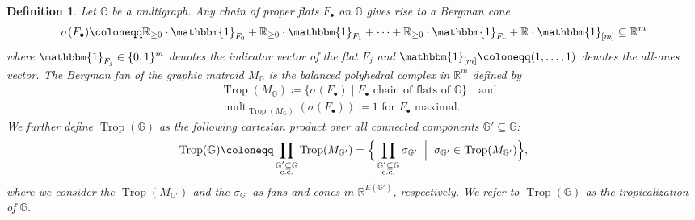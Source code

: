 \documentclass[11pt,reqno,a4paper]{amsart}
\theoremstyle{theoremstyle}
\theoremstyle{examplestyle}
\newtheorem{definition}[theorem]{Definition}
\theoremstyle{algorithmstyle}
\newcommand{\GG}{\mathbb{G}}
\newcommand{\RR}{\mathbb{R}}
\newcommand{\suchthat}{\;\ifnum\currentgrouptype=16 \middle\fi|\;}
\newcommand{\bigmid}{\left.\vphantom{\Big\{} \suchthat \vphantom{\Big\}}\right.}
\newcommand{\bbone}{\mathbbm{1}}
\DeclareMathOperator{\mult}{mult}
\DeclareMathOperator{\Trop}{Trop}
\begin{document}
\begin{definition}
  \label{def:tropicalization}
  Let $\GG$ be a multigraph.  Any chain of proper flats $F_\bullet$ on $\GG$ gives rise to a \emph{Bergman cone}
  \begin{equation*}
    \sigma(F_\bullet)\coloneqq \RR_{\geq 0}\cdot \bbone_{F_0}+\RR_{\geq 0}\cdot \bbone_{F_1}+\dots+\RR_{\geq 0}\cdot \bbone_{F_r}+\RR\cdot \bbone_{[m]}\subseteq\RR^m
  \end{equation*}
  where $\bbone_{F_j}\in \{0,1\}^m$ denotes the indicator vector of the flat $F_j$ and $\bbone_{[m]}\coloneqq(1,\dots,1)$ denotes the all-ones vector.
  The \emph{Bergman fan} of the graphic matroid $M_\GG$ is the balanced polyhedral complex in $\RR^m$ defined by
  \begin{align*}
    &\Trop(M_\GG) \coloneqq \{\sigma(F_\bullet)\mid F_\bullet \text{ chain of flats of }\GG\} \quad\text{and}\\[1mm]
    &\mult_{\Trop(M_\GG)}(\sigma(F_\bullet))\coloneqq 1 \text{ for } F_\bullet \text{ maximal}.
  \end{align*}  
  We further define $\Trop(\GG)$ as the following cartesian product over all connected components $\GG'\subseteq\GG$:
  \begin{equation*}
    \Trop(\GG) \coloneqq \prod_{\substack{\GG'\subseteq \GG\\ \text{c.c.}}} \Trop(M_{\GG'})=\Big\{\prod_{\substack{\GG'\subseteq \GG\\ \text{c.c.}}} \sigma_{\GG'} \bigmid \sigma_{\GG'}\in \Trop(M_{\GG'})\Big\},
  \end{equation*}
  where we consider the $\Trop(M_{\GG'})$ and the $\sigma_{\GG'}$ as fans and cones in $\RR^{E(\GG')}$, respectively.  We refer to $\Trop(\GG)$ as the \emph{tropicalization} of $\GG$.
\end{definition}
\end{document}
